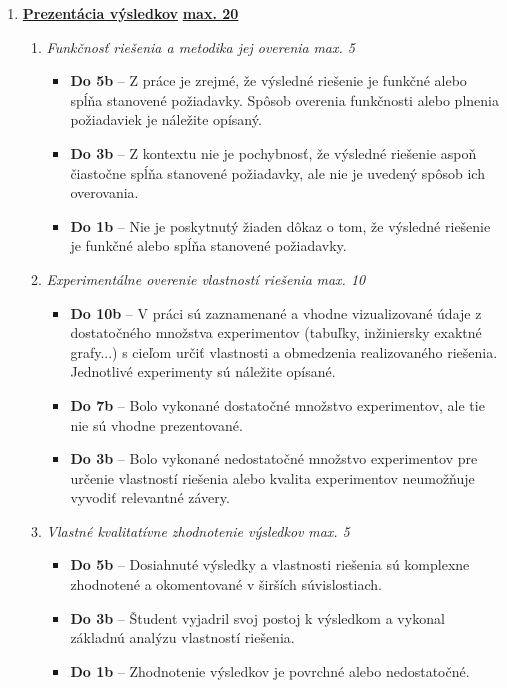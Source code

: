 \begin{enumerate}[label=\textbf{\arabic*.}]
    \item \underline{\textbf{Prezentácia výsledkov}} \hfill \underline{\textbf{max. 20}}
    \begin{enumerate}
        \item \textit{Funkčnosť riešenia a metodika jej overenia} \hfill \textit{max. 5}
        \begin{itemize}
            \item \textbf{Do 5b} – Z práce je zrejmé, že výsledné riešenie je funkčné alebo spĺňa stanovené požiadavky. Spôsob overenia funkčnosti alebo plnenia požiadaviek je náležite opísaný. 
            \item \textbf{Do 3b} – Z kontextu nie je pochybnosť, že výsledné riešenie aspoň čiastočne spĺňa stanovené požiadavky, ale nie je uvedený spôsob ich overovania. 
            \item \textbf{Do 1b} – Nie je poskytnutý žiaden dôkaz o tom, že výsledné riešenie je funkčné alebo spĺňa stanovené požiadavky. 
        \end{itemize}

        \item \textit{Experimentálne overenie vlastností riešenia} \hfill \textit{max. 10}
        \begin{itemize}
            \item \textbf{Do 10b} – V práci sú zaznamenané a vhodne vizualizované údaje z dostatočného množstva experimentov (tabuľky, inžiniersky exaktné grafy...) s cieľom určiť vlastnosti a obmedzenia realizovaného riešenia. Jednotlivé experimenty sú náležite opísané. 
            \item \textbf{Do 7b} – Bolo vykonané dostatočné množstvo experimentov, ale tie nie sú vhodne prezentované. 
            \item \textbf{Do 3b} – Bolo vykonané nedostatočné množstvo experimentov pre určenie vlastností riešenia alebo kvalita experimentov neumožňuje vyvodiť relevantné závery. 
        \end{itemize}

        \item \textit{Vlastné kvalitatívne zhodnotenie výsledkov} \hfill \textit{max. 5}
        \begin{itemize}
            \item \textbf{Do 5b} – Dosiahnuté výsledky a vlastnosti riešenia sú komplexne zhodnotené a okomentované v širších súvislostiach. 
            \item \textbf{Do 3b} – Študent vyjadril svoj postoj k výsledkom a vykonal základnú analýzu vlastností riešenia. 
            \item \textbf{Do 1b} – Zhodnotenie výsledkov je povrchné alebo nedostatočné. 
        \end{itemize}
    \end{enumerate}


\end{enumerate}

